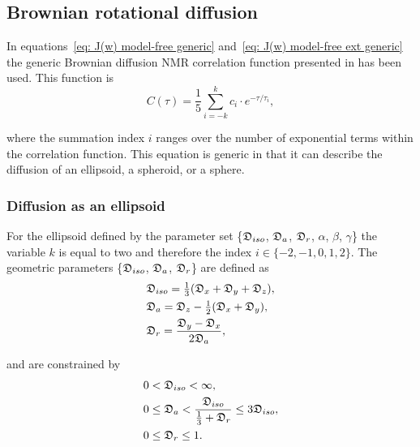 \begin{htmlonly}
\begin{htmlonly}
\subsection{Brownian rotational diffusion}

In equations~\eqref{eq: J(w) model-free generic} and~\eqref{eq: J(w) model-free ext generic} the generic Brownian diffusion NMR correlation function presented in \citet{dAuvergne06} has been used.
This function is
\begin{equation} \label{eq: C(tau) generic}
    C(\tau) = \frac{1}{5} \sum_{i=-k}^k c_i \cdot e^{-\tau/\tau_i},
\end{equation}

\noindent where the summation index $i$ ranges over the number of exponential terms within the correlation function.
This equation is generic in that it can describe the diffusion of an ellipsoid, a spheroid, or a sphere.



\subsubsection{Diffusion as an ellipsoid}

For the ellipsoid defined by the parameter set \{$\mathfrak{D}_{iso}$, $\mathfrak{D}_a$, $\mathfrak{D}_r$, $\alpha$, $\beta$, $\gamma$\} the variable $k$ is equal to two and therefore the index $i \in \{-2, -1, 0, 1, 2\}$.
The geometric parameters \{$\mathfrak{D}_{iso}$, $\mathfrak{D}_a$, $\mathfrak{D}_r$\} are defined as
\begin{subequations}
\begin{align}
    & \mathfrak{D}_{iso} = \tfrac{1}{3} (\mathfrak{D}_x + \mathfrak{D}_y + \mathfrak{D}_z ),   \label{eq: Diso ellipsoid def} \\
    & \mathfrak{D}_a = \mathfrak{D}_z - \tfrac{1}{2}(\mathfrak{D}_x + \mathfrak{D}_y),         \label{eq: Da ellipsoid def} \\
    & \mathfrak{D}_r = \frac{\mathfrak{D}_y - \mathfrak{D}_x}{2\mathfrak{D}_a},                \label{eq: Dr ellipsoid def}
\end{align}
\end{subequations}

\noindent and are constrained by
\begin{subequations}
\begin{align}
    0 & < \mathfrak{D}_{iso} < \infty,                                                    \label{eq: Diso lim} \\
    0 & \le \mathfrak{D}_a < \frac{\mathfrak{D}_{iso}}{\tfrac{1}{3} + \mathfrak{D}_r} \le 3\mathfrak{D}_{iso}, \label{eq: Da lim} \\
    0 & \le \mathfrak{D}_r \le 1.                                                         \label{eq: Dr lim}
\end{align}
\end{subequations}


\end{htmlonly}
\end{htmlonly}

